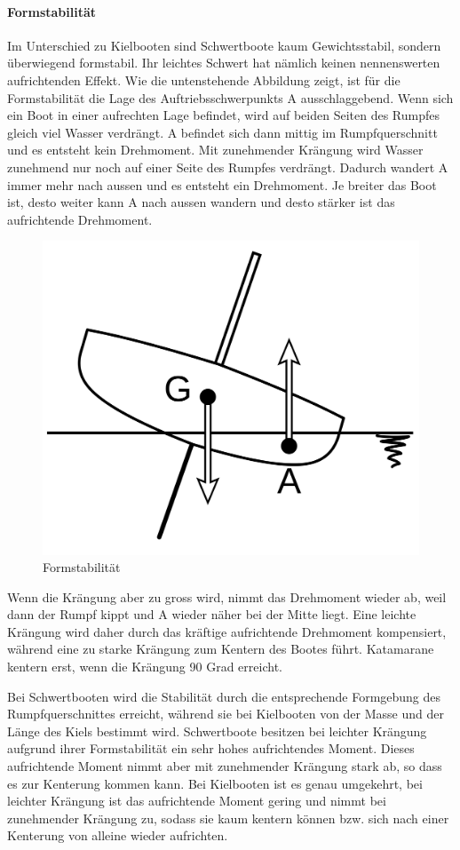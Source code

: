 \paragraph{Formstabilität}
Im Unterschied zu Kielbooten sind Schwertboote kaum Gewichtsstabil, sondern überwiegend formstabil. Ihr leichtes Schwert hat nämlich keinen nennenswerten aufrichtenden Effekt. Wie die untenstehende Abbildung zeigt, ist für die Formstabilität die Lage des Auftriebsschwerpunkts A ausschlaggebend. Wenn sich ein Boot in einer aufrechten Lage befindet, wird auf beiden Seiten des Rumpfes gleich viel Wasser verdrängt. A befindet sich dann mittig im Rumpfquerschnitt und es entsteht kein Drehmoment. Mit zunehmender Krängung wird Wasser zunehmend nur noch auf einer Seite des Rumpfes verdrängt. Dadurch wandert A immer mehr nach aussen und es entsteht ein Drehmoment. Je breiter das Boot ist, desto weiter kann A nach aussen wandern und desto stärker ist das aufrichtende Drehmoment. 
\begin{figure}[H]
    \centering
    \includegraphics[width=0.5\linewidth]{Segeln_Formstabilitaet.svg.png}
    \caption{Formstabilität }
    \label{fig:enter-label}
\end{figure}
Wenn die Krängung aber zu gross wird, nimmt das Drehmoment wieder ab, weil dann der Rumpf kippt und A wieder näher bei der Mitte liegt. Eine leichte Krängung wird daher durch das kräftige aufrichtende Drehmoment kompensiert, während eine zu starke Krängung zum Kentern des Bootes führt. Katamarane kentern erst, wenn die Krängung 90 Grad erreicht. 

Bei Schwertbooten wird die Stabilität durch die entsprechende Formgebung des Rumpfquerschnittes erreicht, während sie bei Kielbooten von der Masse und der Länge des Kiels bestimmt wird. Schwertboote besitzen bei leichter Krängung aufgrund ihrer Formstabilität ein sehr hohes aufrichtendes Moment. Dieses aufrichtende Moment nimmt aber mit zunehmender Krängung stark ab, so dass es zur Kenterung kommen kann. Bei Kielbooten ist es genau umgekehrt, bei leichter Krängung ist das aufrichtende Moment gering und nimmt bei zunehmender Krängung zu, sodass sie kaum kentern können bzw. sich nach einer Kenterung von alleine wieder aufrichten. 
\cite{noauthor_schwertboot_2023}
